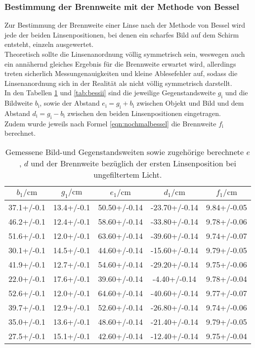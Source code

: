 \subsubsection{Bestimmung der Brennweite mit der Methode von Bessel}
Zur Bestimmung der Brennweite einer Linse nach der Methode von Bessel wird jede der beiden Linsenpositionen, bei denen ein scharfes Bild auf dem Schirm entsteht, einzeln ausgewertet. \\
Theoretisch sollte die Linsenanordnung völlig symmetrisch sein, weswegen auch ein annähernd gleiches Ergebnis für die Brennweite erwartet wird, allerdings treten sicherlich Messungenauigkeiten und kleine Ablesefehler auf, sodass die Linsenanordnung sich in der Realität als nicht völlig symmetrisch darstellt.
\\In den Tabellen \ref{tab:besseli} und \ref{tab:bessii} sind die jeweilige Gegenstandsweite $g_\mathrm{i}$ und die Bildweite $b_\mathrm{i}$, sowie der Abstand $e_\mathrm{i}=g_\mathrm{i} + b_\mathrm{i}$ zwischen Objekt und Bild und dem Abstand $d_\mathrm{i}=g_\mathrm{i} - b_\mathrm{i}$ zwischen den beiden Linsenpositionen eingetragen.
\\Zudem wurde jeweils nach Formel \ref{eqn:nochmalbessel} die Brennweite $f_\mathrm{i}$ berechnet.
\begin{table}
  \caption{Gemessene Bild-und Gegenstandsweiten sowie zugehörige berechnete $e$, $d$ und der Brennweite bezüglich der ersten Linsenposition bei ungefiltertem Licht. }
  \label{tab:besseli}
  \centering
\begin{tabular}{ccccc}
  \toprule
$b_\mathrm{1}/\si{\centi\meter}$ & $g_\mathrm{1}/\si{\centi\meter}$ & $e_\mathrm{1}/\si{\centi\meter}$ & $d_\mathrm{1}/\si{\centi\meter}$ & $f_\mathrm{1}/\si{\centi\meter}$ \\
\midrule
37.1+/-0.1 & 13.4+/-0.1 & 50.50+/-0.14 & -23.70+/-0.14 & 9.84+/-0.05 \\
46.2+/-0.1 & 12.4+/-0.1 & 58.60+/-0.14 & -33.80+/-0.14 & 9.78+/-0.06 \\
51.6+/-0.1 & 12.0+/-0.1 & 63.60+/-0.14 & -39.60+/-0.14 & 9.74+/-0.07 \\
30.1+/-0.1 & 14.5+/-0.1 & 44.60+/-0.14 & -15.60+/-0.14 & 9.79+/-0.05 \\
41.9+/-0.1 & 12.7+/-0.1 & 54.60+/-0.14 & -29.20+/-0.14 & 9.75+/-0.06 \\
22.0+/-0.1 & 17.6+/-0.1 & 39.60+/-0.14 & -4.40+/-0.14 & 9.78+/-0.04 \\
52.6+/-0.1 & 12.0+/-0.1 & 64.60+/-0.14 & -40.60+/-0.14 & 9.77+/-0.07 \\
39.7+/-0.1 & 12.9+/-0.1 & 52.60+/-0.14 & -26.80+/-0.14 & 9.74+/-0.06 \\
35.0+/-0.1 & 13.6+/-0.1 & 48.60+/-0.14 & -21.40+/-0.14 & 9.79+/-0.05 \\
27.5+/-0.1 & 15.1+/-0.1 & 42.60+/-0.14 & -12.40+/-0.14 & 9.75+/-0.04 \\
\bottomrule
\end{tabular}
\end{table}
